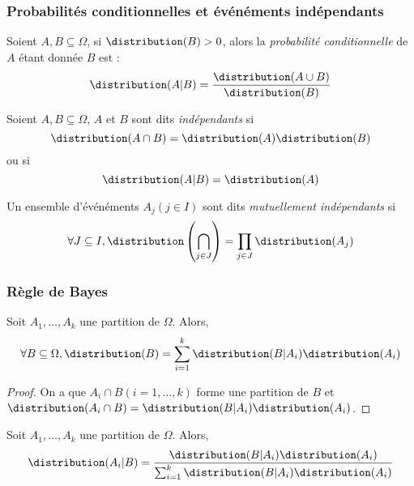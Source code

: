     \subsubsection{Probabilités conditionnelles et événéments indépendants}
        \begin{definition}
            Soient \(A, B \subseteq \Omega\), si \(\distribution(B) > 0\), alors la \textit{probabilité conditionnelle} de \(A\) étant donnée \(B\) est :
            \[
                \distribution(A | B) = \frac{\distribution(A \cup B)}{\distribution(B)}
            \]
        \end{definition}

        \begin{definition}
            Soient \(A, B \subseteq \Omega\), \(A\) et \(B\) sont dits \textit{indépendants} si 
            \[
                \distribution(A \cap B) = \distribution(A)\distribution(B)
            \]
            ou si
            \[
                \distribution(A | B) = \distribution(A)   
            \]

            Un ensemble d'événéments \(A_j (j \in I)\) sont dits \textit{mutuellement indépendants} si
            \[
                \forall J \subseteq I, \distribution\left(\bigcap_{j\in J}\right) = \prod_{j\in J} \distribution(A_j)
            \]
        \end{definition}

    \subsubsection{Règle de Bayes}
        \begin{theorem}
            Soit \(A_1, \dots, A_k\) une partition de \(\Omega\). Alors,
            \[
                \forall B \subseteq \Omega, \distribution(B) = \sum_{i=1}^k \distribution(B | A_i) \distribution(A_i)
            \]
        \end{theorem}
        \begin{proof}
            On a que \(A_i \cap B (i = 1, \dots, k)\) forme une partition de \(B\) et \(\distribution(A_i \cap B) = \distribution(B | A_i) \distribution(A_i)\).
        \end{proof}

        \begin{theorem}[Bayes]
            Soit \(A_1, \dots, A_k\) une partition de \(\Omega\). Alors,
            \[
                \distribution(A_i | B) = \frac{\distribution(B | A_i) \distribution(A_i)}{\sum_{i=1}^k \distribution(B | A_i)\distribution(A_i)}
            \]
        \end{theorem}